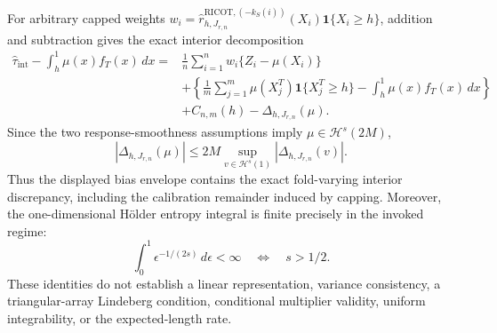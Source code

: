 For arbitrary capped weights \(w_i=\widehat r^{\mathrm{RICOT},(-k_S(i))}_{h,J_{r,n}}(X_i)\mathbf 1\{X_i\ge h\}\), addition and subtraction gives the exact interior decomposition
\[
\begin{aligned}
\widehat\tau_{\mathrm{int}}-\int_h^1\mu(x)f_T(x)\,dx
={}&\frac1n\sum_{i=1}^nw_i\{Z_i-\mu(X_i)\}\\
&+\left\{\frac1m\sum_{j=1}^m\mu(X_j^T)\mathbf 1\{X_j^T\ge h\}-\int_h^1\mu(x)f_T(x)\,dx\right\}\\
&+C_{n,m}(h)-\Delta_{h,J_{r,n}}(\mu).
\end{aligned}
\]
Since the two response-smoothness assumptions imply \(\mu\in\mathcal H^s(2M)\),
\[
|\Delta_{h,J_{r,n}}(\mu)|\le2M\sup_{v\in\mathcal H^s(1)}|\Delta_{h,J_{r,n}}(v)|.
\]
Thus the displayed bias envelope contains the exact fold-varying interior discrepancy, including the calibration remainder induced by capping. Moreover, the one-dimensional Hölder entropy integral is finite precisely in the invoked regime:
\[
\int_0^1\epsilon^{-1/(2s)}\,d\epsilon<\infty\quad\Longleftrightarrow\quad s>1/2.
\]
These identities do not establish a linear representation, variance consistency, a triangular-array Lindeberg condition, conditional multiplier validity, uniform integrability, or the expected-length rate.